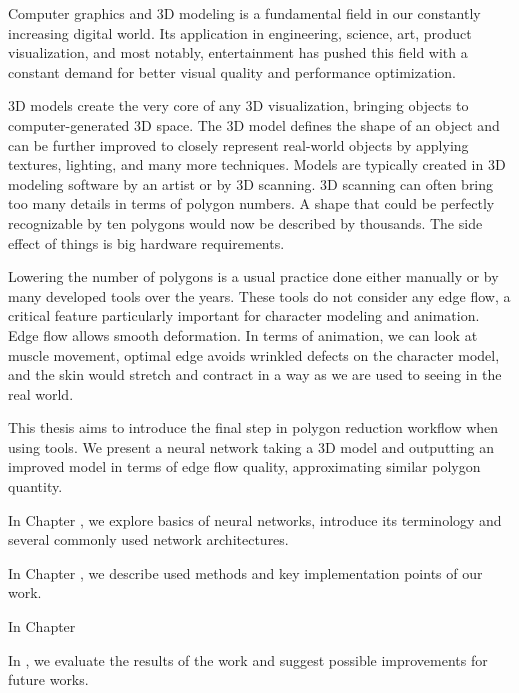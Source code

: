 Computer graphics and 3D modeling is a fundamental field in our constantly increasing digital world. Its application in engineering, science, art, product visualization, and most notably, entertainment has pushed this field with a constant demand for better visual quality and performance optimization.

3D models create the very core of any 3D visualization, bringing objects to computer-generated 3D space. The 3D model defines the shape of an object and can be further improved to closely represent real-world objects by applying textures, lighting, and many more techniques. Models are typically created in 3D modeling software by an artist or by 3D scanning. 3D scanning can often bring too many details in terms of polygon numbers. A shape that could be perfectly recognizable by ten polygons would now be described by thousands. The side effect of things is big hardware requirements.

Lowering the number of polygons is a usual practice done either manually or by many developed tools over the years. These tools do not consider any edge flow, a critical feature particularly important for character modeling and animation. Edge flow allows smooth deformation. In terms of animation, we can look at muscle movement, optimal edge avoids wrinkled defects on the character model, and the skin would stretch and contract in a way as we are used to seeing in the real world.

This thesis aims to introduce the final step in polygon reduction workflow when using tools. We present a neural network taking a 3D model and outputting an improved model in terms of edge flow quality, approximating similar polygon quantity.

\begin{description}

    \item In Chapter , we explore basics of neural networks, introduce its terminology and several commonly used network architectures.
    
    \item In Chapter , we describe used methods and key implementation points of our work.
    
    \item In Chapter 

    \item In , we evaluate the results of the work and suggest possible improvements for future works.
\end{description}